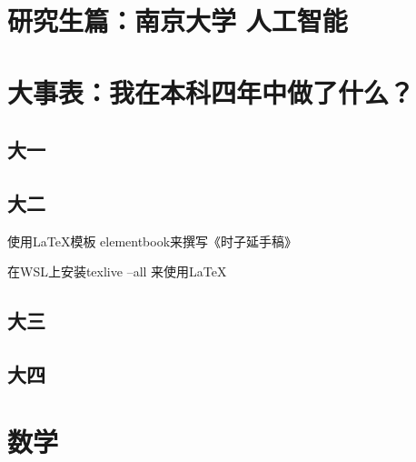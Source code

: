 \documentclass[lang=cn,newtx,10pt,color=green,scheme=chinese]{elegantbook}
\begin{document}
\chapter{研究生篇：南京大学 人工智能}

\chapter{大事表：我在本科四年中做了什么？}
\section{大一}
\section{大二}


\begin{change}
    \item 使用\LaTeX{}模板 elementbook来撰写《时子延手稿》
    \item 在WSL上安装texlive --all 来使用\LaTeX{}
\end{change}



\section{大三}
\section{大四}

\nocite{*} %
\printbibliography[heading=bibintoc, title=\ebibname]
\appendix

\chapter{数学}
\end{document}
